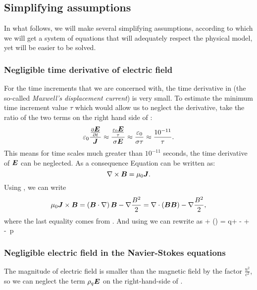\subsection{Simplifying assumptions}
In what follows, we will make several simplifying assumptions, according to which we will get a system of equations that will adequately respect the physical model, yet will be easier to be solved.
\subsubsection{Negligible time derivative of electric field}
For the time increments that we are concerned with, the time derivative in  (the so-called \textit{Maxwell's displacement current}) is
very small. To estimate the minimum time increment value $\tau$ which would allow us to neglect the derivative, take the ratio of the two terms on the right hand side of :
\begin{equation}
\varepsilon_0 \frac{\frac{\partial{\mbox{\boldmath $E$}}}{\partial{t}}}{\mbox{\boldmath $J$}} \approx \frac{\frac{\varepsilon_0 \mbox{\boldmath $E$}}{\tau}}{\sigma\mbox{\boldmath $E$}} \approx \frac{\varepsilon_0}{\sigma \tau} \approx \frac{10^{-11}}{\tau}.
\end{equation}
This means for time scales much greater than $10^{-11}$ seconds, the time derivative of $\mbox{\boldmath $E$}$ can be neglected. As a consequence Equation  can be written as:
\begin{equation}
\label{Assumption1} \nabla \times \mbox{\boldmath $B$} = \mu_0 \mbox{\boldmath $J$}.
\end{equation}
Using , we can write
\begin{equation}
\label{Asssumption11} \mu_0 \mbox{\boldmath $J$} \times \mbox{\boldmath $B$} = \left(\mbox{\boldmath $B$}\cdot\nabla\right)\mbox{\boldmath $B$} - \nabla\frac{B^2}{2} = \nabla\cdot\left(\mbox{\boldmath $B$}\mbox{\boldmath $B$}\right) - \nabla\frac{B^2}{2},
\end{equation}
where the last equality comes from . And using  we can rewrite  as
\be
\label{NSEq2}  + \nabla\cdot\left(\bfpi\otimes\bfu\right) =  q\bfE + \nabla\cdot\lo{}\bfB\bfB - \ro + \rho\bfg - \nabla\,p
\ee

\subsubsection{Negligible electric field in the Navier-Stokes equations}
The magnitude of electric field is smaller than the magnetic field by the factor $\frac{u^2}{c^2}$, so we can neglect the term $\rho_q\mbox{\boldmath $E$}$ on the right-hand-side of .

